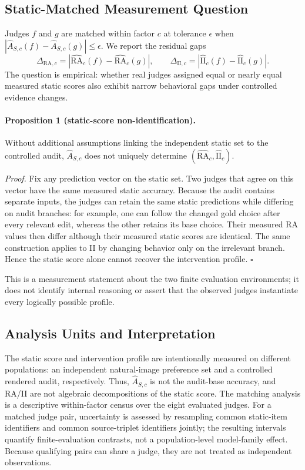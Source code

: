 \subsection{Static-Matched Measurement Question}
\label{sec:measurement_question}

Judges $f$ and $g$ are matched within factor $c$ at tolerance $\epsilon$ when
$|\widehat A_{S,c}(f)-\widehat A_{S,c}(g)|\leq\epsilon$. We report the residual
gaps
\begin{equation}
\Delta_{\mathrm{RA},c}=|\widehat{\mathrm{RA}}_c(f)-
\widehat{\mathrm{RA}}_c(g)|,\qquad
\Delta_{\mathrm{II},c}=|\widehat{\mathrm{II}}_c(f)-
\widehat{\mathrm{II}}_c(g)|.
\label{eq:behavior_gaps}
\end{equation}
The question is empirical: whether real judges assigned equal or nearly equal
measured static scores also exhibit narrow behavioral gaps under controlled
evidence changes.

\paragraph{Proposition 1 (static-score non-identification).}
Without additional assumptions linking the independent static set to the
controlled audit, $\widehat A_{S,c}$ does not uniquely determine
$(\widehat{\mathrm{RA}}_c,\widehat{\mathrm{II}}_c)$.

\emph{Proof.}
Fix any prediction vector on the static set. Two judges that agree on this
vector have the same measured static accuracy. Because the audit contains
separate inputs, the judges can retain the same static predictions while
differing on audit branches: for example, one can follow the changed gold
choice after every relevant edit, whereas the other retains its base choice.
Their measured RA values then differ although their measured static scores are
identical. The same construction applies to II by changing behavior only on
the irrelevant branch. Hence the static score alone cannot recover the
intervention profile. $\square$

This is a measurement statement about the two finite evaluation environments;
it does not identify internal reasoning or assert that the observed judges
instantiate every logically possible profile.

\subsection{Analysis Units and Interpretation}

The static score and intervention profile are intentionally measured on
different populations: an independent natural-image preference set and a
controlled rendered audit, respectively. Thus, $\widehat A_{S,c}$ is not the
audit-base accuracy, and RA/II are not algebraic decompositions of the static
score. The matching analysis is a descriptive within-factor census over the
eight evaluated judges. For a matched judge pair, uncertainty is assessed by
resampling common static-item identifiers and common source-triplet identifiers
jointly; the resulting intervals quantify finite-evaluation contrasts, not a
population-level model-family effect. Because qualifying pairs can share a
judge, they are not treated as independent observations.
